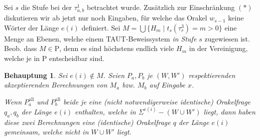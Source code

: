 \documentclass[nofonts]{uebung}
\newtheorem{claim}[theorem]{Behauptung}
\def\P{\ensuremath{\mathrm{P}}}
\begin{document}
Sei $s$ die Stufe bei der $\tau^1_{a,b}$ betrachtet wurde.
Zusätzlich zur Einschränkung $(\ast)$ diskutieren wir ab jetzt nur noch Eingaben, für welche das Orakel $w_{s-1}$ keine Wörter der Länge $e(i)$ definiert.
Sei $M=\bigcup \{ H_m \mid t_s(\tau^3_{r})=m>0 \}$ eine Menge an Ebenen, welche einem TAUT-Beweissystem \emph{in Stufe $s$} zugewiesen ist.
Beob. dass $M\in \P$, denn es sind höchstens endlich viele $H_m$ in der Vereinigung, welche je in $\P$ entscheidbar sind.


\begin{claim}
    Sei $e(i)\not\in M$.
    Seien $P_a, P_b$ je $(W, W')$ respektierenden akzeptierenden Berechnungen von $M_a$ bzw. $M_b$ auf Eingabe $x$.

    Wenn $P^\mathrm{all}_a$ und $P^\mathrm{all}_b$ beide je eine (nicht notwendigerweise identische) Orakelfrage $q_a, q_b$ der Länge $e(i)$ enthalten, welche in $\Sigma^{e(i)}-(W\cup W')$ liegt, dann haben diese zwei Berechnungen eine (identische) Orakelfrage $q$ der Länge $e(i)$ gemeinsam, welche nicht in $W\cup W'$ liegt.
\end{claim}
\end{document}
